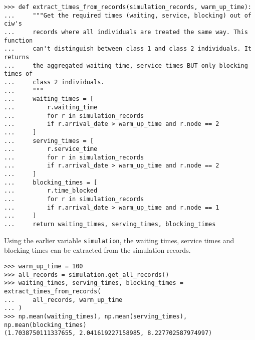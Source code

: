 \begin{lstlisting}[style=pystyle]
>>> def extract_times_from_records(simulation_records, warm_up_time):
...     """Get the required times (waiting, service, blocking) out of ciw's
...     records where all individuals are treated the same way. This function
...     can't distinguish between class 1 and class 2 individuals. It returns
...     the aggregated waiting time, service times BUT only blocking times of
...     class 2 individuals.
...     """
...     waiting_times = [
...         r.waiting_time
...         for r in simulation_records
...         if r.arrival_date > warm_up_time and r.node == 2
...     ]
...     serving_times = [
...         r.service_time
...         for r in simulation_records
...         if r.arrival_date > warm_up_time and r.node == 2
...     ]
...     blocking_times = [
...         r.time_blocked
...         for r in simulation_records
...         if r.arrival_date > warm_up_time and r.node == 1
...     ]
...     return waiting_times, serving_times, blocking_times

\end{lstlisting}

Using the earlier variable \lstinline[style=pystyle]{simulation}, the waiting
times, service times and blocking times can be extracted from the simulation
records.

\begin{lstlisting}[style=pystyle]
>>> warm_up_time = 100
>>> all_records = simulation.get_all_records()
>>> waiting_times, serving_times, blocking_times = extract_times_from_records(
...     all_records, warm_up_time
... )
>>> np.mean(waiting_times), np.mean(serving_times), np.mean(blocking_times)
(1.7038750111337655, 2.041619227158985, 8.227702587974997)

\end{lstlisting}